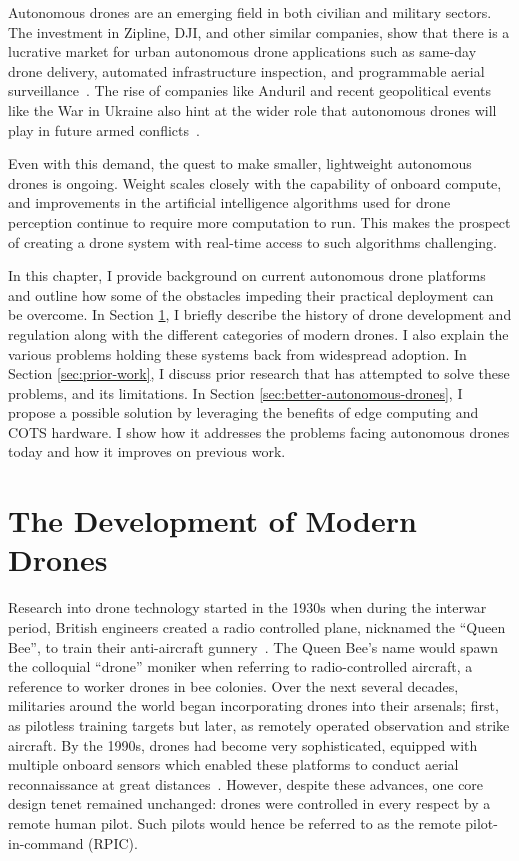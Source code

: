 Autonomous drones are an emerging field in both civilian and military sectors. The investment in Zipline, DJI, and other similar companies, show that there is a lucrative market for urban autonomous drone applications such as same-day drone delivery, automated infrastructure inspection, and programmable aerial surveillance~\cite{GrandviewResearchDroneMarket,ForbesZiplineEvaluation}. The rise of companies like Anduril and recent geopolitical events like the War in Ukraine also hint at the wider role that autonomous drones will play in future armed conflicts~\cite{CNBC,CFAS}.

Even with this demand, the quest to make smaller, lightweight autonomous drones is ongoing. Weight scales closely with the capability of onboard compute, and improvements in the artificial intelligence algorithms used for drone perception continue to require more computation to run. This makes the prospect of creating a drone system with real-time access to such algorithms challenging.

In this chapter, I provide background on current autonomous drone platforms and outline how some of the obstacles impeding their practical deployment can be overcome. In Section \ref{sec:history-drone-development}, I briefly describe the history of drone development and regulation along with the different categories of modern drones. I also explain the various problems holding these systems back from widespread adoption. In Section \ref{sec:prior-work}, I discuss prior research that has attempted to solve these problems, and its limitations. In Section \ref{sec:better-autonomous-drones}, I propose a possible solution by leveraging the benefits of edge computing and COTS hardware. I show how it addresses the problems facing autonomous drones today and how it improves on previous work.

\section{The Development of Modern Drones}
\label{sec:history-drone-development}

Research into drone technology started in the 1930s when during the interwar period, British engineers created a radio controlled plane, nicknamed the ``Queen Bee'', to train their anti-aircraft gunnery~\cite{IWMDrone}. The Queen Bee's name would spawn the colloquial ``drone'' moniker when referring to radio-controlled aircraft, a reference to worker drones in bee colonies. Over the next several decades, militaries around the world began incorporating drones into their arsenals; first, as pilotless training targets but later, as remotely operated observation and strike aircraft. By the 1990s, drones had become very sophisticated, equipped with multiple onboard sensors which enabled these platforms to conduct aerial reconnaissance at great distances~\cite{GlobalHawk}. However, despite these advances, one core design tenet remained unchanged: drones were controlled in every respect by a remote human pilot. Such pilots would hence be referred to as the remote pilot-in-command (RPIC).


